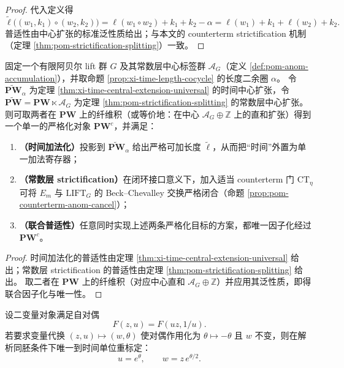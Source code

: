 \begin{proof}
代入定义得
\[
\widetilde\ell\bigl((w_1,k_1)\circ(w_2,k_2)\bigr)
=\ell(w_1\circ w_2)+k_1+k_2-\alpha
=\ell(w_1)+k_1+\ell(w_2)+k_2.
\]
普适性由中心扩张的标准泛性质给出；与本文的 counterterm strictification 机制（定理 \ref{thm:pom-strictification-splitting}）一致。
\end{proof}

\begin{corollary}\label{cor:xi-double-central-extension-universal-strictification}
固定一个有限阿贝尔 lift 群 \(G\) 及其常数层中心标签群 \(\mathcal{A}_G\)（定义 \ref{def:pom-anom-accumulation}），并取命题 \ref{prop:xi-time-length-cocycle} 的长度二余圈 \(\alpha\)。
令 \(\widetilde{\mathbf{PW}}_{\alpha}\) 为定理 \ref{thm:xi-time-central-extension-universal} 的时间中心扩张，令
\(\widetilde{\mathbf{PW}}=\mathbf{PW}\ltimes\mathcal{A}_G\)
为定理 \ref{thm:pom-strictification-splitting} 的常数层中心扩张。
则可取两者在 \(\mathbf{PW}\) 上的纤维积（或等价地：在中心 \(\mathcal{A}_G\oplus\mathbb Z\) 上的直和扩张）得到一个单一的严格化对象 \(\mathbf{PW}^{c}\)，并满足：
\begin{enumerate}
  \item \textbf{（时间加法化）}投影到 \(\widetilde{\mathbf{PW}}_{\alpha}\) 给出严格可加长度 \(\widetilde\ell\)，从而把“时间”外置为单一加法寄存器；
  \item \textbf{（常数层 strictification）}在闭环接口意义下，加入适当 counterterm 门 \(\mathrm{CT}_\eta\) 可将 \(E_m\) 与 \(\mathrm{LIFT}_G\) 的 Beck--Chevalley 交换严格闭合（命题 \ref{prop:pom-counterterm-anom-cancel}）；
  \item \textbf{（联合普适性）}任意同时实现上述两条严格化目标的方案，都唯一因子化经过 \(\mathbf{PW}^{c}\)。
\end{enumerate}
\end{corollary}
\begin{proof}
时间加法化的普适性由定理 \ref{thm:xi-time-central-extension-universal} 给出；常数层 strictification 的普适性由定理 \ref{thm:pom-strictification-splitting} 给出。
取二者在 \(\mathbf{PW}\) 上的纤维积（对应中心直和 \(\mathcal{A}_G\oplus\mathbb Z\)）并应用其泛性质，即得联合因子化与唯一性。
\end{proof}

\begin{proposition}\label{prop:xi-completed-coordinate-rigidity-time-reversal}
设二变量对象满足自对偶
\[
F(z,u)=F(uz,1/u).
\]
若要求变量代换 \((z,u)\mapsto (w,\theta)\) 使对偶作用化为
\(
\theta\mapsto-\theta
\)
且 \(w\) 不变，则在解析同胚条件下唯一到时间单位重标定：
\[
u=e^{\theta},
\qquad
w=z\,e^{\theta/2}.
\]
\end{proposition}

